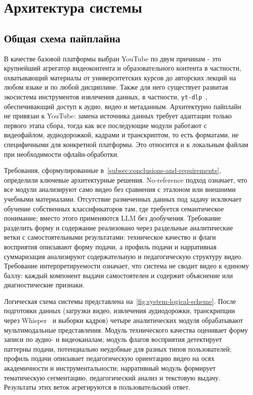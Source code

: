 \section{Архитектура системы}
\label{sec:architecture}

\subsection{Общая схема пайплайна}

В качестве базовой платформы выбран YouTube по двум причинам - это крупнейший агрегатор видеоконтента и образовательного контента в частности,
охватывающий материалы от университетских курсов до авторских лекций на любом языке и по любой дисциплине.
Также для него существует развитая экосистема инструментов извлечения данных, в частности, \texttt{yt-dlp}~\cite{ytdlp2021},
обеспечивающий доступ к аудио, видео и метаданным.
Архитектурно пайплайн не привязан к YouTube: замена источника данных требует адаптации только первого этапа сбора,
тогда как все последующие модули работают с видеофайлом, аудиодорожкой, кадрами и транскриптом, то есть форматами,
не специфичными для конкретной платформы.
Это относится и к локальным файлам при необходимости офлайн-обработки.



Требования, сформулированные в~\cref{subsec:conclusions-and-requirements},
определили ключевые архитектурные решения.
No-reference подход означает, что все модули анализируют само видео
без сравнения с эталоном или внешними учебными материалами.
Отсутствие размеченных данных под задачу исключает обучение собственных
классификаторов там, где требуется семантическое понимание;
вместо этого применяются LLM без дообучения.
Требование разделить форму и содержание реализовано через раздельные
аналитические ветки с самостоятельными результатами:
техническое качество и флаги восприятия описывают форму подачи,
а профиль подачи и нарративная суммаризация анализируют содержательную
и педагогическую структуру видео.
Требование интерпретируемости означает, что система не сводит видео
к единому баллу: каждый компонент выдачи самостоятелен и содержит
объяснение или диагностические признаки.

Логическая схема системы представлена на~\cref{fig:system-logical-scheme}.
После подготовки данных (загрузки видео, извлечения аудиодорожки,
транскрипции через Whisper~\cite{radford2022whisper} и выборки кадров) 
четыре аналитических модуля обрабатывают мультимодальные представления.
Модуль технического качества оценивает форму записи по аудио- и видеоканалам;
модуль флагов восприятия детектирует паттерны подачи, потенциально неудобные
для разных типов пользователей; профиль подачи описывает педагогическую
ориентацию видео на осях академичности и инструментальности; нарративный модуль
формирует тематическую сегментацию, педагогический анализ и текстовую выдачу.
Результаты этих веток агрегируются в пользовательский ответ.

